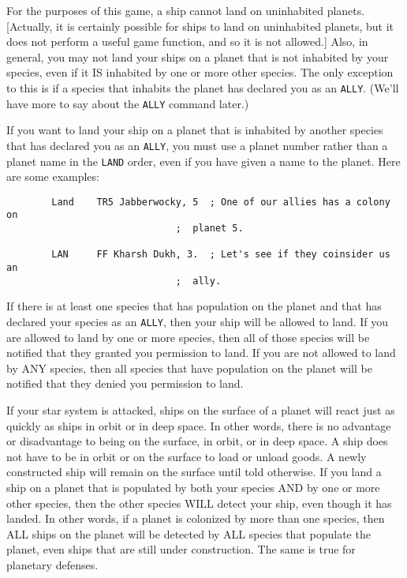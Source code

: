 \documentclass[10pt,titlepage]{article}
\begin{document}
For the purposes of this game, a ship cannot land on uninhabited planets.
[Actually, it is certainly possible for ships to land on uninhabited planets,
but it does not perform a useful game function, and so it is not allowed.]
Also, in general, you may not land your ships on a planet that is not inhabited
by your species, even if it IS inhabited by one or more other species.  The
only exception to this is if a species that inhabits the planet has declared
you as an \texttt{ALLY}.  (We'll have more to say about the \texttt{ALLY} command later.)

If you want to land your ship on a planet that is inhabited by another species
that has declared you as an \texttt{ALLY}, you must use a planet number rather than a
planet name in the \texttt{LAND} order, even if you have given a name to the planet.
Here are some examples:

\begin{verbatim}
        Land    TR5 Jabberwocky, 5  ; One of our allies has a colony on
                              ;  planet 5.

        LAN     FF Kharsh Dukh, 3.  ; Let's see if they coinsider us an
                              ;  ally.
\end{verbatim} 

If there is at least one species that has population on the planet and that has
declared your species as an \texttt{ALLY}, then your ship will be allowed to land.  If
you are allowed to land by one or more species, then all of those species will
be notified that they granted you permission to land.  If you are not allowed
to land by ANY species, then all species that have population on the planet
will be notified that they denied you permission to land.

If your star system is attacked, ships on the surface of a planet will react
just as quickly as ships in orbit or in deep space.  In other words, there is
no advantage or disadvantage to being on the surface, in orbit, or in deep
space.  A ship does not have to be in orbit or on the surface to load or
unload goods.  A newly constructed ship will remain on the surface until told
otherwise.  If you land a ship on a planet that is populated by both your
species AND by one or more other species, then the other species WILL detect
your ship, even though it has landed.  In other words, if a planet is colonized
by more than one species, then ALL ships on the planet will be detected by ALL
species that populate the planet, even ships that are still under construction.
The same is true for planetary defenses.
\end{document}
